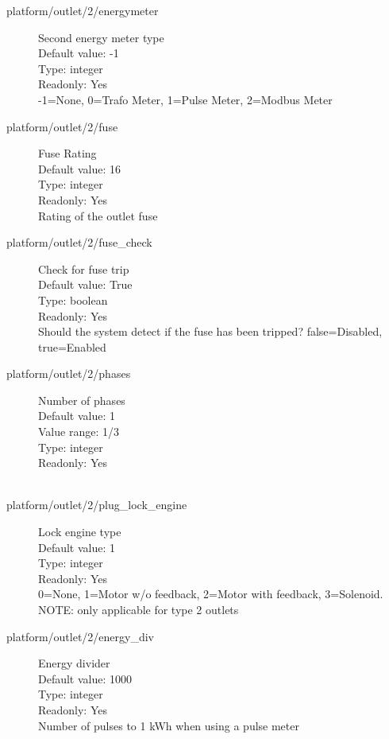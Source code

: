 \begin{description}
\item[platform/outlet/2/energymeter] Second energy meter type\\
  Default value: -1\\
  Type: integer\\
  Readonly: Yes\\
  -1=None, 0=Trafo Meter, 1=Pulse Meter, 2=Modbus Meter\\

\item[platform/outlet/2/fuse] Fuse Rating\\
  Default value: 16\\
  Type: integer\\
  Readonly: Yes\\
  Rating of the outlet fuse\\

\item[platform/outlet/2/fuse\_check] Check for fuse trip\\
  Default value: True\\
  Type: boolean\\
  Readonly: Yes\\
  Should the system detect if the fuse has been tripped? false=Disabled, true=Enabled\\

\item[platform/outlet/2/phases] Number of phases\\
  Default value: 1\\
  Value range: 1/3\\
  Type: integer\\
  Readonly: Yes\\
  \\

\item[platform/outlet/2/plug\_lock\_engine] Lock engine type\\
  Default value: 1\\
  Type: integer\\
  Readonly: Yes\\
  0=None, 1=Motor w/o feedback, 2=Motor with feedback, 3=Solenoid. NOTE: only applicable for type 2 outlets\\

\item[platform/outlet/2/energy\_div] Energy divider\\
  Default value: 1000\\
  Type: integer\\
  Readonly: Yes\\
  Number of pulses to 1 kWh when using a pulse meter\\


\end{description}
